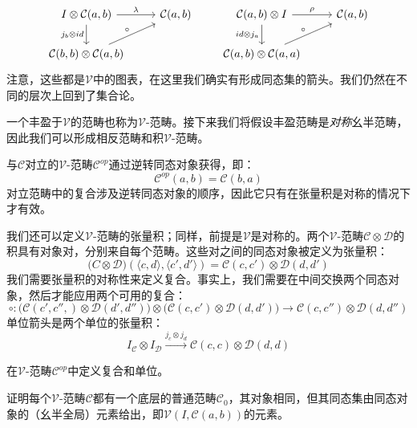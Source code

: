 \documentclass[DaoFP]{subfiles}
\begin{document}
 \[
  \begin{tikzcd}
   I \otimes \mathcal C(a, b)
   \arrow[r, "\lambda"]
   \arrow[d, "j_b \otimes id"']
   & \mathcal C(a, b)
   \\
   \mathcal C(b, b) \otimes \mathcal C(a, b)
   \arrow[ru, "\circ"]
  \end{tikzcd}
  \qquad
  \begin{tikzcd}
   \mathcal C(a, b) \otimes I
   \arrow[r, "\rho"]
   \arrow[d, "id \otimes j_a"']
   & \mathcal C(a, b)
   \\
   \mathcal C(a, b) \otimes \mathcal C(a, a)
   \arrow[ru, "\circ"]
  \end{tikzcd}
 \]
 注意，这些都是$\mathcal V$中的图表，在这里我们确实有形成同态集的箭头。我们仍然在不同的层次上回到了集合论。

 一个丰盈于$\mathcal V$的范畴也称为$\mathcal V$-范畴。接下来我们将假设丰盈范畴是\emph{对称}幺半范畴，因此我们可以形成相反范畴和积$\mathcal V$-范畴。

 与$\mathcal C$对立的$\mathcal V$-范畴$\mathcal C^{op}$通过逆转同态对象获得，即：
 \[ \mathcal C^{op}(a, b) = \mathcal C(b, a) \]
 对立范畴中的复合涉及逆转同态对象的顺序，因此它只有在张量积是对称的情况下才有效。

 我们还可以定义$\mathcal V$-范畴的张量积；同样，前提是$\mathcal V$是对称的。两个$\mathcal V$-范畴$\mathcal C \otimes \mathcal D$的积具有对象对，分别来自每个范畴。这些对之间的同态对象被定义为张量积：
 \[ \mathcal (C \otimes \mathcal D) (\langle c, d \rangle, \langle c', d' \rangle) = \mathcal C(c, c') \otimes \mathcal D (d, d') \]
 我们需要张量积的对称性来定义复合。事实上，我们需要在中间交换两个同态对象，然后才能应用两个可用的复合：
 \[ \circ \colon  \big(\mathcal C(c', c'',) \otimes \mathcal D (d', d'')\big) \otimes \big( \mathcal C(c, c') \otimes \mathcal D (d, d')\big) \to  \mathcal C(c, c'') \otimes \mathcal D (d, d'') \]
 单位箭头是两个单位的张量积：
 \[ I_{\mathcal C} \otimes I_{\mathcal D} \xrightarrow{j_c \otimes j_d} \mathcal C(c, c) \otimes \mathcal D (d, d) \]


 \begin{exercise}
  在$\mathcal V$-范畴$\mathcal C^{op}$中定义复合和单位。
 \end{exercise}

 \begin{exercise}
  证明每个$\mathcal V$-范畴$\mathcal C$都有一个底层的普通范畴$\mathcal C_0$，其对象相同，但其同态集由同态对象的（幺半全局）元素给出，即$\mathcal V(I, \mathcal C(a, b))$的元素。
 \end{exercise}
\end{document}
